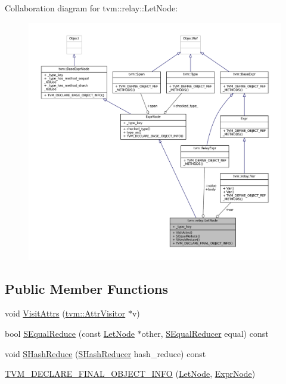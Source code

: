 Collaboration diagram for tvm\+:\+:relay\+:\+:Let\+Node\+:
\nopagebreak
\begin{figure}[H]
\begin{center}
\leavevmode
\includegraphics[width=350pt]{classtvm_1_1relay_1_1LetNode__coll__graph}
\end{center}
\end{figure}
\subsection*{Public Member Functions}
\begin{DoxyCompactItemize}
\item 
void \hyperlink{classtvm_1_1relay_1_1LetNode_af33038e205e09c6dc38c9fa81f371239}{Visit\+Attrs} (\hyperlink{classtvm_1_1AttrVisitor}{tvm\+::\+Attr\+Visitor} $\ast$v)
\item 
bool \hyperlink{classtvm_1_1relay_1_1LetNode_a011174b4de11fa84b95ba1d525953425}{S\+Equal\+Reduce} (const \hyperlink{classtvm_1_1relay_1_1LetNode}{Let\+Node} $\ast$other, \hyperlink{classtvm_1_1SEqualReducer}{S\+Equal\+Reducer} equal) const 
\item 
void \hyperlink{classtvm_1_1relay_1_1LetNode_a2221bbdf24cb6bb031d275d8ca1888e4}{S\+Hash\+Reduce} (\hyperlink{classtvm_1_1SHashReducer}{S\+Hash\+Reducer} hash\+\_\+reduce) const 
\item 
\hyperlink{classtvm_1_1relay_1_1LetNode_a48604e83eee549184f76d36ca3ada2fc}{T\+V\+M\+\_\+\+D\+E\+C\+L\+A\+R\+E\+\_\+\+F\+I\+N\+A\+L\+\_\+\+O\+B\+J\+E\+C\+T\+\_\+\+I\+N\+FO} (\hyperlink{classtvm_1_1relay_1_1LetNode}{Let\+Node}, \hyperlink{namespacetvm_1_1relay_a387f18e050d016c52ea6c4781e7cff6c}{Expr\+Node})
\end{DoxyCompactItemize}
